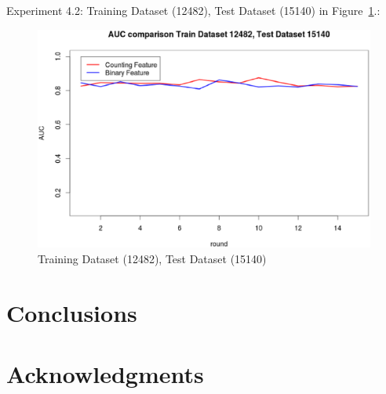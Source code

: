 \documentclass{sig-alternate}
\begin{document}
Experiment 4.2: Training Dataset  (12482), Test Dataset  (15140) in Figure~\ref{fig:fig11}.:
\begin{figure}[h]
\centering
\includegraphics[width=\columnwidth]{12482_15140.eps}
\caption{Training Dataset  (12482), Test Dataset  (15140)}
\label{fig:fig11}
\end{figure}

\fi





\section{Conclusions}
 

\section{Acknowledgments}




%


%
%
\end{document}

